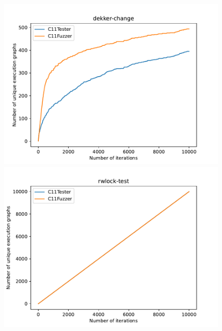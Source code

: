 \begin{figure}[H]
    \centering
    \begin{minipage}{0.45\textwidth}
        \centering
        \includegraphics[width=\textwidth]{figure/dekker-change.pdf}
    \end{minipage}
    \hfill
    \begin{minipage}{0.45\textwidth}
        \centering
        \includegraphics[width=\textwidth]{figure/rwlock-test.pdf}
    \end{minipage}

    \vspace{0.5cm}


\end{figure}
